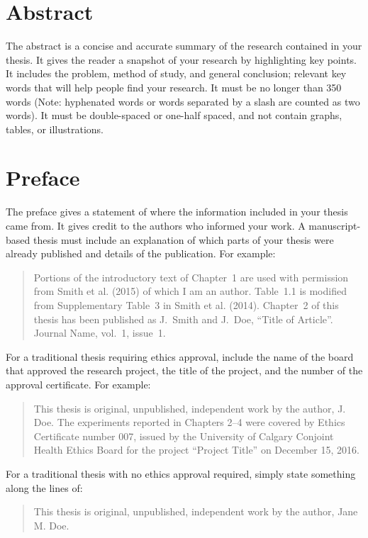 
\chapter{Abstract}

The abstract is a concise and accurate summary of the research
contained in your thesis. It gives the reader a snapshot of your
research by highlighting key points. It includes the problem, method of
study, and general conclusion; relevant key words that will help
people find your research. It must be no longer than 350 words (Note:
hyphenated words or words separated by a slash are counted as two
words). It must be double-spaced or one-half spaced, and not contain
graphs, tables, or illustrations.

\chapter{Preface}

The preface gives a statement of where the information included in
your thesis came from. It gives credit to the authors who informed
your work.  A manuscript-based thesis must include an explanation of
which parts of your thesis were already published and details of the
publication. For example:
\begin{quote}
Portions of the introductory text of Chapter~1 are used with
permission from Smith et al. (2015) of which I am an author. Table~1.1
is modified from Supplementary Table~3 in Smith et
al. (2014). Chapter~2 of this thesis has been published as J.~Smith
and J.~Doe, ``Title of Article''. Journal Name, vol.~1, issue~1.
\end{quote}
For a traditional thesis requiring ethics approval, include the name
of the board that approved the research project, the title of the
project, and the number of the approval certificate. For example:
\begin{quote}
This thesis is original, unpublished, independent work by the author,
J. Doe.  The experiments reported in Chapters 2--4 were covered by
Ethics Certificate number 007, issued by the University of Calgary
Conjoint Health Ethics Board for the project ``Project Title'' on
December 15, 2016.
\end{quote}
For a traditional thesis with no ethics approval required, simply
state something along the lines of:
\begin{quote}
This thesis is original, unpublished, independent work by the author,
Jane M. Doe.
\end{quote}
  
